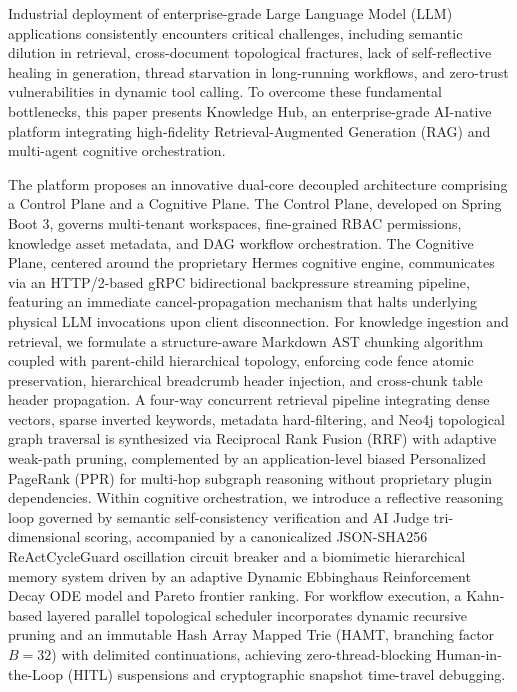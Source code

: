 \begin{abstract*}
    Industrial deployment of enterprise-grade Large Language Model (LLM) applications consistently encounters critical challenges, including semantic dilution in retrieval, cross-document topological fractures, lack of self-reflective healing in generation, thread starvation in long-running workflows, and zero-trust vulnerabilities in dynamic tool calling. To overcome these fundamental bottlenecks, this paper presents Knowledge Hub, an enterprise-grade AI-native platform integrating high-fidelity Retrieval-Augmented Generation (RAG) and multi-agent cognitive orchestration.

    The platform proposes an innovative dual-core decoupled architecture comprising a Control Plane and a Cognitive Plane. The Control Plane, developed on Spring Boot 3, governs multi-tenant workspaces, fine-grained RBAC permissions, knowledge asset metadata, and DAG workflow orchestration. The Cognitive Plane, centered around the proprietary Hermes cognitive engine, communicates via an HTTP/2-based gRPC bidirectional backpressure streaming pipeline, featuring an immediate cancel-propagation mechanism that halts underlying physical LLM invocations upon client disconnection. For knowledge ingestion and retrieval, we formulate a structure-aware Markdown AST chunking algorithm coupled with parent-child hierarchical topology, enforcing code fence atomic preservation, hierarchical breadcrumb header injection, and cross-chunk table header propagation. A four-way concurrent retrieval pipeline integrating dense vectors, sparse inverted keywords, metadata hard-filtering, and Neo4j topological graph traversal is synthesized via Reciprocal Rank Fusion (RRF) with adaptive weak-path pruning, complemented by an application-level biased Personalized PageRank (PPR) for multi-hop subgraph reasoning without proprietary plugin dependencies. Within cognitive orchestration, we introduce a reflective reasoning loop governed by semantic self-consistency verification and AI Judge tri-dimensional scoring, accompanied by a canonicalized JSON-SHA256 ReActCycleGuard oscillation circuit breaker and a biomimetic hierarchical memory system driven by an adaptive Dynamic Ebbinghaus Reinforcement Decay ODE model and Pareto frontier ranking. For workflow execution, a Kahn-based layered parallel topological scheduler incorporates dynamic recursive pruning and an immutable Hash Array Mapped Trie (HAMT, branching factor $B=32$) with delimited continuations, achieving zero-thread-blocking Human-in-the-Loop (HITL) suspensions and cryptographic snapshot time-travel debugging.


\end{abstract*}
